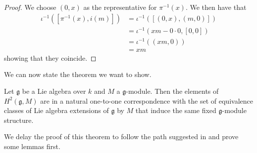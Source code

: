 \begin{proof}
  We choose $ (0, x) $ as the representative for $ \pi^{-1}(x) $. We then have that
  \begin{align*}
    \iota^{-1}\left( [\pi^{-1}(x), i(m)] \right) &= \iota^{-1}\left( [(0,x), (m, 0)] \right) \\
                                             &= \iota^{-1}\left(xm - 0\cdot0, [0,0]\right) \\
                                             &= \iota^{-1}((xm, 0)) \\
                                             &= xm
  \end{align*}
  showing that they coincide.
\end{proof}
We can now state the theorem we want to show.

\begin{theorem}
  \label{thm:equivalence}
  Let $ \mathfrak{g} $ be a Lie algebra over $ k $ and $ M $ a $ \mathfrak{g} $-module. Then the elements of $ H^2(\mathfrak{g}, M) $ are in a natural one-to-one correspondence with the set of equivalence classes of Lie algebra extensions of $ \mathfrak{g} $ by $ M $ that induce the same fixed $ \mathfrak{g} $-module structure.
\end{theorem}
We delay the proof of this theorem to follow the path suggested in \cite[Exercise 7.7.5]{weibel1994homological} and prove some lemmas first.

